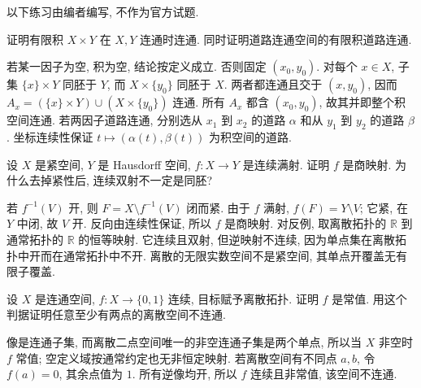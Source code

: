 以下练习由编者编写, 不作为官方试题.
\begin{exercise}
证明有限积 $X\times Y$ 在 $X,Y$ 连通时连通. 同时证明道路连通空间的有限积道路连通.
\end{exercise}
\begin{solution}
若某一因子为空, 积为空, 结论按定义成立. 否则固定 $(x_0,y_0)$. 对每个 $x\in X$, 子集 $\{x\}\times Y$ 同胚于 $Y$, 而 $X\times\{y_0\}$ 同胚于 $X$. 两者都连通且交于 $(x,y_0)$, 因而 $A_x=(\{x\}\times Y)\cup(X\times\{y_0\})$ 连通. 所有 $A_x$ 都含 $(x_0,y_0)$, 故其并即整个积空间连通. 若两因子道路连通, 分别选从 $x_1$ 到 $x_2$ 的道路 $\alpha$ 和从 $y_1$ 到 $y_2$ 的道路 $\beta$. 坐标连续性保证 $t\mapsto(\alpha(t),\beta(t))$ 为积空间的道路.
\end{solution}
\begin{exercise}
设 $X$ 是紧空间, $Y$ 是 Hausdorff 空间, $f:X\to Y$ 是连续满射. 证明 $f$ 是商映射. 为什么去掉紧性后, 连续双射不一定是同胚?
\end{exercise}
\begin{solution}
若 $f^{-1}(V)$ 开, 则 $F=X\setminus f^{-1}(V)$ 闭而紧. 由于 $f$ 满射, $f(F)=Y\setminus V$; 它紧, 在 $Y$ 中闭, 故 $V$ 开. 反向由连续性保证, 所以 $f$ 是商映射. 对反例, 取离散拓扑的 $\mathbb R$ 到通常拓扑的 $\mathbb R$ 的恒等映射. 它连续且双射, 但逆映射不连续, 因为单点集在离散拓扑中开而在通常拓扑中不开. 离散的无限实数空间不是紧空间, 其单点开覆盖无有限子覆盖.
\end{solution}
\begin{exercise}
设 $X$ 是连通空间, $f:X\to\{0,1\}$ 连续, 目标赋予离散拓扑. 证明 $f$ 是常值. 用这个判据证明任意至少有两点的离散空间不连通.
\end{exercise}
\begin{solution}
像是连通子集, 而离散二点空间唯一的非空连通子集是两个单点, 所以当 $X$ 非空时 $f$ 常值; 空定义域按通常约定也无非恒定映射. 若离散空间有不同点 $a,b$, 令 $f(a)=0$, 其余点值为 $1$. 所有逆像均开, 所以 $f$ 连续且非常值, 该空间不连通.
\end{solution}
